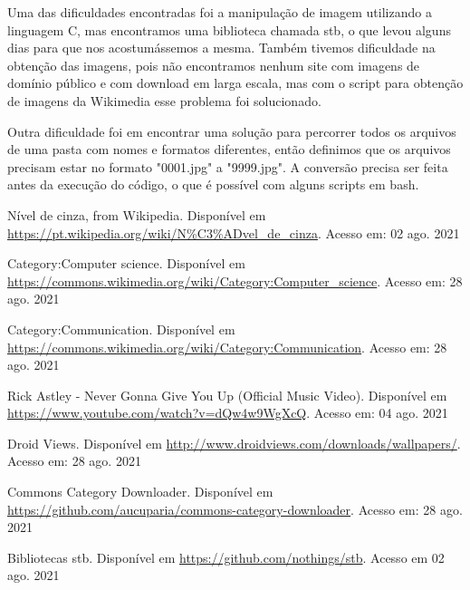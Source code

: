 \documentclass{article}
\begin{document}
Uma das dificuldades encontradas foi a manipulação de imagem utilizando a linguagem C, mas encontramos uma biblioteca chamada stb\cite{stb}, o que levou alguns dias para que nos acostumássemos a mesma. Também tivemos dificuldade na obtenção das imagens, pois não encontramos nenhum site com imagens de domínio público e com download em larga escala, mas com o script para obtenção de imagens da Wikimedia esse problema foi solucionado.

Outra dificuldade foi em encontrar uma solução para percorrer todos os arquivos de uma pasta com nomes e formatos diferentes, então definimos que os arquivos precisam estar no formato "0001.jpg" a "9999.jpg". A conversão precisa ser feita antes da execução do código, o que é possível com alguns scripts em bash.

\begin{thebibliography}{7}

Nível de cinza, from Wikipedia. Disponível em \url{https://pt.wikipedia.org/wiki/N\%C3\%ADvel_de_cinza}. Acesso em: 02 ago. 2021

Category:Computer science. Disponível em \url{https://commons.wikimedia.org/wiki/Category:Computer\_science}. Acesso em: 28 ago. 2021

Category:Communication. Disponível em \url{https://commons.wikimedia.org/wiki/Category:Communication}. Acesso em: 28 ago. 2021

Rick Astley - Never Gonna Give You Up (Official Music Video). Disponível em \url{https://www.youtube.com/watch?v=dQw4w9WgXcQ}. Acesso em: 04 ago. 2021

Droid Views. Disponível em \url{http://www.droidviews.com/downloads/wallpapers/}. Acesso em: 28 ago. 2021

Commons Category Downloader. Disponível em \url{https://github.com/aucuparia/commons-category-downloader}. Acesso em: 28 ago. 2021

Bibliotecas stb. Disponível em \url{https://github.com/nothings/stb}. Acesso em 02 ago. 2021

\end{thebibliography}
\end{document}
